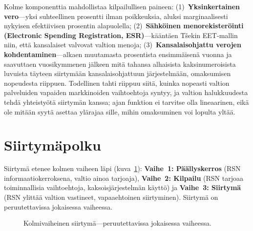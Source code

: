 \documentclass[11pt,a4paper,twocolumn]{article}
\begin{document}
Kolme komponenttia mahdollistaa kilpailullisen paineen: (1)~\textbf{Yksinkertainen vero}---yksi suhteellinen prosentti ilman poikkeuksia, aluksi marginaalisesti nykyisen efektiivisen prosentin alapuolella; (2)~\textbf{Sähköinen menorekisteröinti (Electronic Spending Registration, ESR)}---kääntäen Tšekin EET-mallin niin, että kansalaiset valvovat valtion menoja; (3)~\textbf{Kansalaisohjattu verojen kohdentaminen}---alkaen muutamasta prosentista ensimmäisenä vuonna ja saavuttaen vuosikymmenen jälkeen mitä tahansa alhaisista kaksinumeroisista luvuista täyteen siirtymään kansalaisohjattuun järjestelmään, omaksumisen nopeudesta riippuen. Todellinen tahti riippuu siitä, kuinka nopeasti valtion palveluiden vapaiden markkinoiden vaihtoehtoja syntyy, ja valtion halukkuudesta tehdä yhteistyötä siirtymän kanssa; ajan funktion ei tarvitse olla lineaarinen, eikä ole mitään syytä asettaa ylärajaa sille, mihin omaksuminen voi lopulta yltää.

\section{Siirtymäpolku}

Siirtymä etenee kolmen vaiheen läpi (kuva~\ref{fig:migration}): \textbf{Vaihe~1: Päällyskerros} (RSN informaatiokerroksena, valtio ainoa tarjoaja), \textbf{Vaihe~2: Kilpailu} (RSN tarjoaa toiminnallisia vaihtoehtoja, kaksoisjärjestelmän käyttö) ja \textbf{Vaihe~3: Siirtymä} (RSN ylittää valtion vastineet, vapaaehtoinen siirtyminen). Siirtymä on peruutettavissa jokaisessa vaiheessa.

\begin{figure}[ht]
\centering
{}
\caption{Kolmivaiheinen siirtymä---peruutettavissa jokaisessa vaiheessa.}
\label{fig:migration}
\end{figure}
\end{document}
